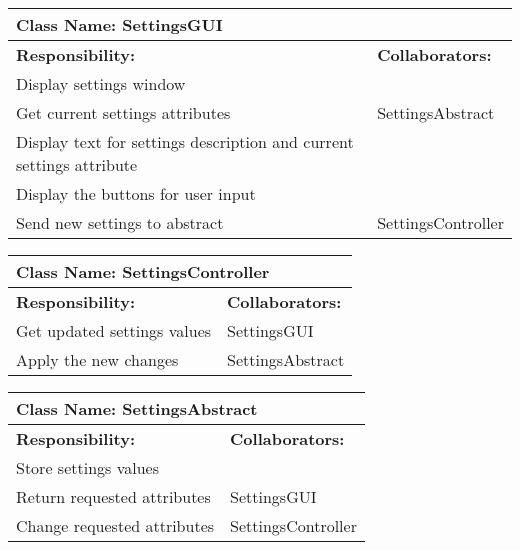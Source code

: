 \documentclass[]{article}
\begin{document}
\begin{enumerate}[a)]
\begin{table}[ht]
\begin{tabular}{|p{5cm}|p{5cm}|}
		\hline
		\end{tabular}
	\end{table}
	\begin{table}[ht]
		\centering
		\begin{tabular}{|p{5cm}|p{5cm}|}
		\hline 
		 \multicolumn{2}{|l|}{\textbf{Class Name: SettingsGUI}} \\
		\hline
		\textbf{Responsibility:} & \textbf{Collaborators:} \\
		\hline
		Display settings window & \\
		\hline
		Get current settings attributes & SettingsAbstract \\
		\hline
		Display text for settings description and current settings attribute & \\
		\hline
		Display the buttons for user input & \\
		\hline
		Send new settings to abstract & SettingsController \\
		\hline
		\end{tabular}
	\end{table}
	\begin{table}[ht]
		\centering
		\begin{tabular}{|p{5cm}|p{5cm}|}
		\hline 
		 \multicolumn{2}{|l|}{\textbf{Class Name: SettingsController}} \\
		\hline
		\textbf{Responsibility:} & \textbf{Collaborators:} \\
		\hline
		Get updated settings values & SettingsGUI\\
		\hline
		Apply the new changes & SettingsAbstract\\
		\hline
		\end{tabular}
	\end{table}
	\begin{table}[ht]
		\centering
		\begin{tabular}{|p{5cm}|p{5cm}|}
		\hline 
		 \multicolumn{2}{|l|}{\textbf{Class Name: SettingsAbstract}} \\
		\hline
		\textbf{Responsibility:} & \textbf{Collaborators:} \\
		\hline
		Store settings values & \\
		\hline
		Return requested attributes & SettingsGUI\\
		\hline
		Change requested attributes & SettingsController\\
		\hline
		\end{tabular}
	\end{table}
	\begin{table}[ht]

\end{table}
\end{enumerate}
\end{document}
